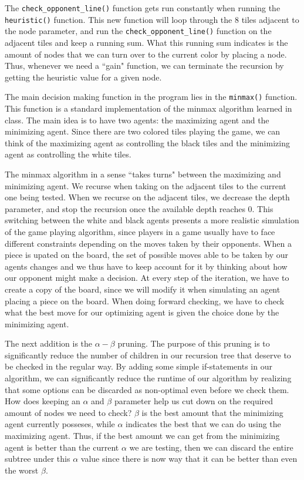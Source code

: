 \documentclass{article}
\begin{document}
The \texttt{check\_opponent\_line()} function gets run constantly when running the \texttt{heuristic()}
	function.
This new function will loop through the 8 tiles adjacent to the node parameter, and run the 
	\texttt{check\_opponent\_line()} function on the adjacent tiles and keep a running sum.
What this running sum indicates is the amount of nodes that we can turn over to the current color by 
	placing a node. 
Thus, whenever we need a ``gain" function, we can terminate the recursion by getting the heuristic value 
	for a given node. 

The main decision making function in the program lies in the \texttt{minmax()} function. 
This function is a standard implementation of the  minmax algorithm learned in class. 
The main idea is to have two agents: the maximizing agent and the minimizing agent. 
Since there are two colored tiles playing the game, we can think of the maximizing agent 
	as controlling the black tiles and the minimizing agent as controlling the white tiles.

The minmax algorithm in a sense ``takes turns" between the maximizing and minimizing agent. 
We recurse when taking on the adjacent tiles to the current one being tested.
When we recurse on the adjacent tiles, we decrease the depth parameter, and stop the recursion once
	the available depth reaches 0. 
This switching between the white and black agents presents a more
	realistic simulation of the game playing algorithm, since players in a game usually have to face
	different constraints depending on the moves taken by their opponents.
When a piece is upated on the board, the set of possible moves able to be taken by our agents changes
	and we thus have to keep account for it by thinking about how our opponent might make a 
	decision.
At every step of the iteration, we have to create a copy of the board, since we will modify it when
simulating an agent placing a piece on the board. 
When doing forward checking, we have to check what the best move for our optimizing agent is given the 
	choice done by the minimizing agent.

The next addition is the $\alpha-\beta$ pruning. The purpose of this pruning is to significantly reduce
	the number of children in our recursion tree that deserve to be checked in the regular way.
By adding some simple if-statements in our algorithm, we can significantly reduce the runtime 
	of our algorithm by realizing that some options can be discarded as non-optimal even before we 
	check them.
How does keeping an $\alpha$ and $\beta$ parameter  help us cut down on the required amount of nodes
we need to check?
$\beta$ is the best amount that the minimizing agent currently posseses, while $\alpha$ indicates the
	best that we can do using the maximizing agent.
Thus, if the best amount we can get from the minimizing agent is better than the current $\alpha$ we are
testing, then we can discard the entire subtree under this $\alpha$ value since there is now way that
it can be better than even the worst $\beta$.
\end{document}
